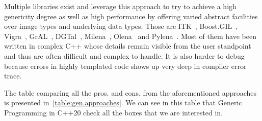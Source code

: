 Multiple libraries exist and leverage this approach to try to achieve a high genericity degree as well as high
performance by offering varied abstract facilities over image types and underlying data types. Those are
ITK~\parencite{johnson.2013.ITKSoftwareGuideThirdEdition,yoo.2002.engineering}, Boost.GIL~\parencite{bourdev.2006.bgil},
Vigra~\parencite{kothe.2011.generic}, GrAL~\parencite{berti.2006.gral}, DGTal~\parencite{coeurjolly.2016.dgtal},
Milena~\parencite{geraud.2012.ipolmeeting,levillain.2009.ismm,levillain.2010.icip},
Olena~\parencite{olena.2000.www,geraud.2000.europlop,levillain.2011.phd,geraud.2012.hdr,levillain.2014.ciarp} and
Pylena~\parencite{carlinet.2018.pylena}. Most of them have been written in complex C++ whose details remain visible from
the user standpoint and thus are often difficult and complex to handle. It is also harder to debug because errors in
highly templated code shows up very deep in compiler error trace.

The table comparing all the pros. and cons. from the aforementioned approaches is presented
in~\cref{table:gen.approaches}. We can see in this table that Generic Programming in C++20 check all the boxes that we
are interested in.

